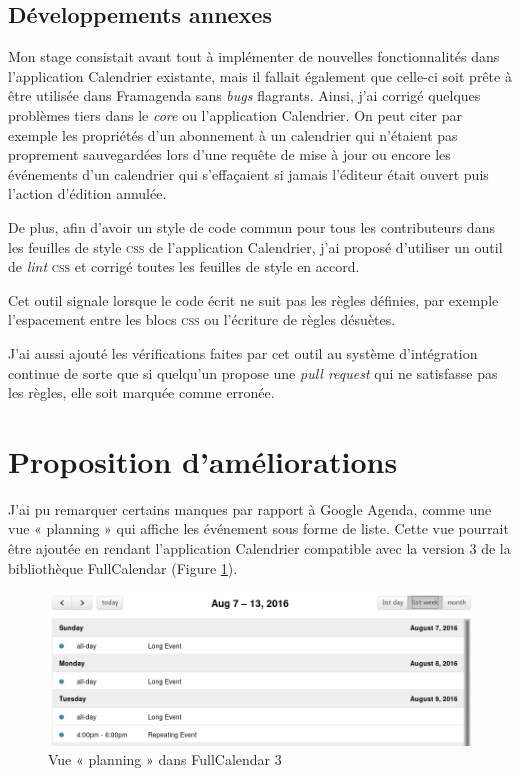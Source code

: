 \documentclass[10pt,a4paper, twoside]{report}
\begin{document}
	\subsection{Développements annexes}
	
	Mon stage consistait avant tout à implémenter de nouvelles fonctionnalités dans l'application Calendrier existante, mais il fallait également que celle-ci soit prête à être utilisée dans Framagenda sans \textit{bugs} flagrants. Ainsi, j'ai corrigé quelques problèmes tiers dans le \textit{core} ou l'application Calendrier.
	On peut citer par exemple les propriétés d'un abonnement à un calendrier qui n'étaient pas proprement sauvegardées lors d'une requête de mise à jour ou encore les événements d'un calendrier qui s'effaçaient si jamais l'éditeur était ouvert puis l'action d'édition annulée.
	
	De plus, afin d'avoir un style de code commun pour tous les contributeurs dans les feuilles de style \textsc{css} de l'application Calendrier, j'ai proposé d'utiliser un outil de \textit{lint} \textsc{css} et corrigé toutes les feuilles de style en accord. 
	
	Cet outil signale lorsque le code écrit ne suit pas les règles définies, par exemple l'espacement entre les blocs \textsc{css} ou l'écriture de règles désuètes.
	
	J'ai aussi ajouté les vérifications faites par cet outil au système d'intégration continue de sorte que si quelqu'un propose une \textit{pull request} qui ne satisfasse pas les règles, elle soit marquée comme erronée.

	\section{Proposition d'améliorations}
	J'ai pu remarquer certains manques par rapport à Google Agenda, comme une vue « planning » qui affiche les événement sous forme de liste. Cette vue pourrait être ajoutée en rendant l'application Calendrier compatible avec la version 3 de la bibliothèque FullCalendar (Figure \ref{planning-fullcalendar}).
	
	\begin{figure}[ht]
		\centering
		\centerline{\includegraphics[width=1.25\textwidth]{images/fullcalendar-3.png}}
		\caption{Vue « planning » dans FullCalendar 3}
		\label{planning-fullcalendar}
	\end{figure}
	
\end{document}
